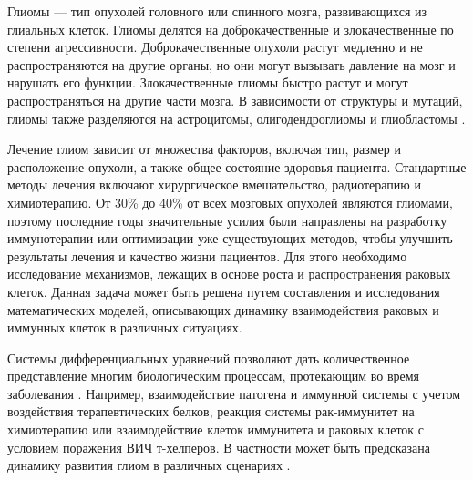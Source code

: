 \documentclass[12pt,a4paper]{extarticle}
\author{М.Д.~Кирдин}
\theoremstyle{definition}
\theoremstyle{definition}
\theoremstyle{definition}
\begin{document}
	\begin{spacing}{1.0}
		\maketitle
	\end{spacing}
	
	\tableofcontents
	
	\begin{introduction}
	
	Глиомы --- тип опухолей головного или спинного мозга, развивающихся из глиальных клеток. Глиомы делятся на доброкачественные и злокачественные по степени агрессивности.  Доброкачественные опухоли растут медленно и не распространяются на другие органы, но они могут вызывать давление на мозг и нарушать его функции. Злокачественные глиомы быстро растут и могут распространяться на другие части мозга. В зависимости от структуры и мутаций, глиомы также разделяются на астроцитомы, олигодендроглиомы и глиобластомы \cite{glioma_classification}.
	
	Лечение глиом зависит от множества факторов, включая тип, размер и расположение опухоли, а также общее состояние здоровья пациента. Стандартные методы лечения включают хирургическое вмешательство, радиотерапию и химиотерапию. От 30\% до 40\% от всех мозговых опухолей \cite{glioma_overview} являются глиомами, поэтому последние годы значительные усилия были направлены на разработку иммунотерапии или оптимизации уже существующих методов, чтобы улучшить результаты лечения и качество жизни пациентов. Для этого необходимо исследование механизмов, лежащих в основе роста и распространения раковых клеток. Данная задача может быть решена путем составления и исследования математических моделей, описывающих динамику взаимодействия раковых и иммунных клеток в различных ситуациях. 
	
	Системы дифференциальных уравнений позволяют дать количественное представление многим биологическим процессам, протекающим во время заболевания \cite{abt_DEs}. Например, взаимодействие патогена и иммунной системы с учетом воздействия терапевтических белков\cite{Kasbawati et.al.}, реакция системы рак-иммунитет на химиотерапию\cite{W. L. Duan et.al.,Xiangdong Liu et.al.,L.G. de Pillis et.al., dePillis L.G. et.al.} или взаимодействие клеток иммунитета и раковых клеток с условием поражения ВИЧ т-хелперов\cite{F. A. Rihan et.al.}. В частности может быть предсказана динамику развития глиом в различных сценариях \cite{gliomae_scenarios}.
	

\end{introduction}
\end{document}
